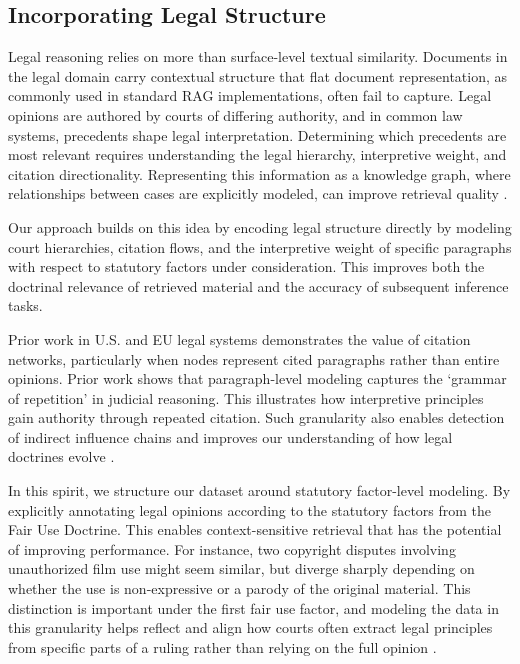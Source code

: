 \subsection{Incorporating Legal Structure}

Legal reasoning relies on more than surface-level textual similarity. Documents in the legal domain carry contextual structure that flat document representation, as commonly used in standard RAG implementations, often fail to capture. Legal opinions are authored by courts of differing authority, and in common law systems, precedents shape legal interpretation. Determining which precedents are most relevant requires understanding the legal hierarchy, interpretive weight, and citation directionality. Representing this information as a knowledge graph, where relationships between cases are explicitly modeled, can improve retrieval quality \cite{07a_KGRAG, 07b_GraphRAG}.

Our approach builds on this idea by encoding legal structure directly by modeling court hierarchies, citation flows, and the interpretive weight of specific paragraphs with respect to statutory factors under consideration. This improves both the doctrinal relevance of retrieved material and the accuracy of subsequent inference tasks.

Prior work in U.S. and EU legal systems demonstrates the value of citation networks, particularly when nodes represent cited paragraphs rather than entire opinions. Prior work shows that paragraph-level modeling captures the `grammar of repetition' in judicial reasoning. This illustrates how interpretive principles gain authority through repeated citation. Such granularity also enables detection of indirect influence chains and improves our understanding of how legal doctrines evolve \cite{32_LegalCitationNetwork}.

In this spirit, we structure our dataset around statutory factor-level modeling. By explicitly annotating legal opinions according to the statutory factors from the Fair Use Doctrine. This enables context-sensitive retrieval that has the potential of improving performance. For instance, two copyright disputes involving unauthorized film use might seem similar, but diverge sharply depending on whether the use is non-expressive or a parody of the original material. This distinction is important under the first fair use factor, and modeling the data in this granularity helps reflect and align how courts often extract legal principles from specific parts of a ruling rather than relying on the full opinion \cite{32_LegalCitationNetwork}.

